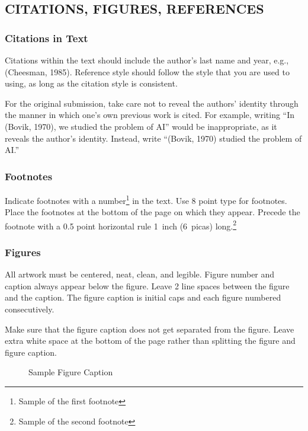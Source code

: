 \documentclass[letterpaper]{article}
\begin{document}
\subsection{CITATIONS, FIGURES, REFERENCES}


\subsubsection{Citations in Text}

Citations within the text should include the author's last name and
year, e.g., (Cheesman, 1985). Reference style should follow the style
that you are used to using, as long as the citation style is
consistent.

For the original submission, take care not to reveal the authors' identity through
the manner in which one's own previous work is cited.  For example, writing
``In (Bovik, 1970), we studied the problem of AI'' would be inappropriate, as
it reveals the author's identity.  Instead, write ``(Bovik, 1970) studied the
problem of AI.''

\subsubsection{Footnotes}

Indicate footnotes with a number\footnote{Sample of the first
footnote} in the text. Use 8 point type for footnotes.  Place the
footnotes at the bottom of the page on which they appear.  Precede the
footnote with a 0.5 point horizontal rule 1~inch (6~picas)
long.\footnote{Sample of the second footnote}

\subsubsection{Figures}

All artwork must be centered, neat, clean, and legible. Figure number
and caption always appear below the figure.  Leave 2 line spaces
between the figure and the caption. The figure caption is initial caps
and each figure numbered consecutively.

Make sure that the figure caption does not get separated from the
figure. Leave extra white space at the bottom of the page rather than
splitting the figure and figure caption.
\begin{figure}[h]
\vspace{1in}
\caption{Sample Figure Caption}
\end{figure}
\end{document}
